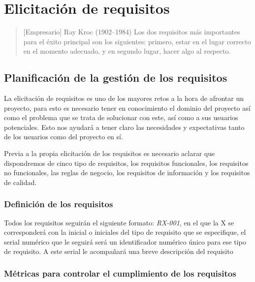 \chapter{Elicitación de requisitos}

\begin{quotation} [Empresario] {Ray Kroc (1902--1984)}
Los dos requisitos más importantes para el éxito principal son los siguientes: primero, estar en el lugar correcto en el momento adecuado, y en segundo lugar, hacer algo al respecto.
\end{quotation}

\begin{abstract}
Para que los proyectos lleguen a buen puerto se han de tener claro desde un principio qué se consideran requisitos indispensables para que el proyecto sea un éxito.
\end{abstract}

\section{Planificación de la gestión de los requisitos}

La elicitación de requisitos es uno de los mayores retos a la hora de afrontar un proyecto, para esto es necesario tener en conocimiento el dominio del proyecto así como el problema que se trata de solucionar con este, así como a sus usuarios potenciales. Esto nos ayudará a tener claro las necesidades y expectativas tanto de los usuarios como del proyecto en sí.

Previa a la propia elicitación de los requisitos es necesario aclarar que dispondremos de cinco tipo de requisitos, los requisitos funcionales, los requisitos no funcionales, las reglas de negocio, los requisitos de información y los requisitos de calidad.

\subsection{Definición de los requisitos}
Todos los requisitos seguirán el siguiente formato: \emph{RX-001}, en el que la X se corresponderá con la inicial o iniciales del tipo de requisito que se especifique, el serial numérico que le seguirá será un identificador numérico único para ese tipo de requisito. A este serial le acompañará una breve descripción del requisito

\subsection{Métricas para controlar el cumplimiento de los requisitos}

